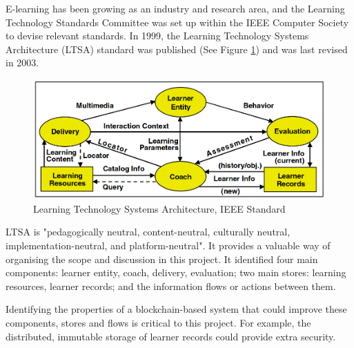 E-learning has been growing as an industry and research area, and the Learning Technology Standards Committee 
was set up within the IEEE Computer Society to devise relevant standards. In 1999, the Learning Technology 
Systems Architecture (LTSA) standard was published (See Figure \ref{fig:LTSA}) and was last revised in 2003.

\begin{figure}[!ht] 
    \centering    
    \includegraphics[width=1.0\textwidth]{ltsa2003}
    \caption[Learning Technology Systems Architecture]
        {Learning Technology Systems Architecture, IEEE Standard \citep[p.9]{ieee2003ltsa}}
    \label{fig:LTSA}
\end{figure}

LTSA is "pedagogically neutral, content-neutral, culturally neutral, implementation-neutral, 
and platform-neutral"\citep[p.1]{ieee2003ltsa}. It provides a valuable way of organising 
the scope and discussion in this project. It identified four main components: learner entity, coach, 
delivery, evaluation; two main stores: learning resources, learner records; and the information flows 
or actions between them.

Identifying the properties of a blockchain-based system that could improve these components, stores and 
flows is critical to this project. For example, the distributed, immutable storage of learner records could 
provide extra security.




